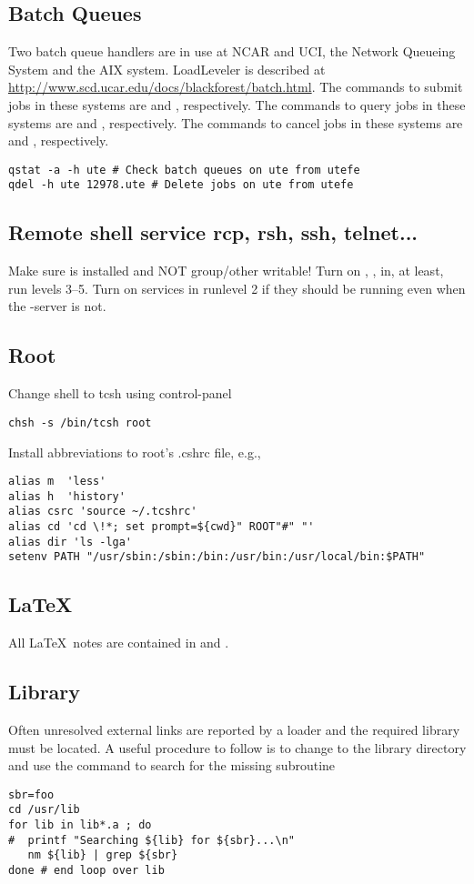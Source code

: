 \documentclass[12pt,twoside]{article}
\begin{document}
\subsection{Batch Queues}\label{sxn:q}
Two batch queue handlers are in use at NCAR and UCI, 
the  Network Queueing System and the AIX
 system.
LoadLeveler is described at
\url{http://www.scd.ucar.edu/docs/blackforest/batch.html}. 
The commands to submit jobs in these systems are
 and , respectively.
The commands to query jobs in these systems are
 and , respectively.
The commands to cancel jobs in these systems are
 and , respectively.
\begin{verbatim}
qstat -a -h ute # Check batch queues on ute from utefe
qdel -h ute 12978.ute # Delete jobs on ute from utefe
\end{verbatim}

\subsection{Remote shell service rcp, rsh, ssh, telnet...}\label{sxn:dmn}
Make sure  is installed and NOT group/other writable!
Turn on , ,  in, at least,
run levels 3--5. 
Turn on services in runlevel 2 if they should be running even when
the -server is not.

\subsection{Root}\label{sxn:root}
Change shell to tcsh using control-panel
\begin{verbatim}
chsh -s /bin/tcsh root
\end{verbatim}
Install abbreviations to root's .cshrc file, e.g.,
\begin{verbatim}
alias m  'less'
alias h  'history'
alias csrc 'source ~/.tcshrc'
alias cd 'cd \!*; set prompt=${cwd}" ROOT"#" "'
alias dir 'ls -lga'
setenv PATH "/usr/sbin:/sbin:/bin:/usr/bin:/usr/local/bin:$PATH"
\end{verbatim}

\subsection[\LaTeX]{\LaTeX}\label{sxn:ltx}
All \LaTeX\ notes are contained in  and .

\subsection{Library}\label{sxn:lbr}
Often unresolved external links are reported by a loader and the
required library must be located.
A useful procedure to follow is to change to the library directory
and use the  command to search for the missing subroutine
\begin{verbatim}
sbr=foo
cd /usr/lib
for lib in lib*.a ; do 
#  printf "Searching ${lib} for ${sbr}...\n"
   nm ${lib} | grep ${sbr}
done # end loop over lib
\end{verbatim}
\end{document}
